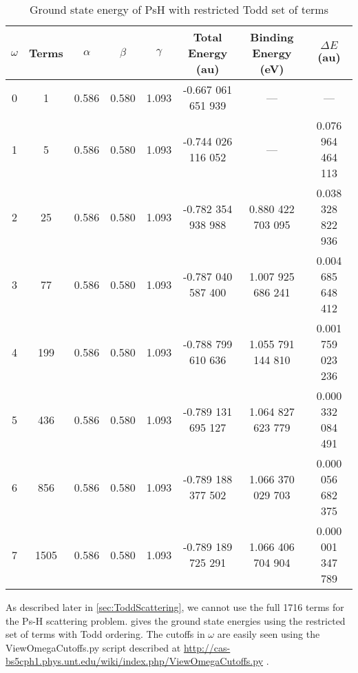 \documentclass[Dissertation.tex]{subfiles}
\begin{document}
\setlength{\abovecaptionskip}{6pt}   %
\setlength{\belowcaptionskip}{6pt}   %
\begin{table}[H]
\small
\centering
\begin{tabular}{c c c c c c c c}
\toprule
$\omega$ & Terms & $\alpha$ & $\beta$ & $\gamma$ & Total Energy (au) & Binding Energy (eV) & $\Delta E$ (au) \\ [0.5ex]
\midrule
0 & 1    & 0.586 & 0.580 & 1.093 & -0.667 061 651 939 & --- & --- \\
1 & 5    & 0.586 & 0.580 & 1.093 & -0.744 026 116 052 & ---               & 0.076 964 464 113 \\
2 & 25   & 0.586 & 0.580 & 1.093 & -0.782 354 938 988 & 0.880 422 703 095 & 0.038 328 822 936 \\
3 & 77   & 0.586 & 0.580 & 1.093 & -0.787 040 587 400 & 1.007 925 686 241 & 0.004 685 648 412 \\
4 & 199  & 0.586 & 0.580 & 1.093 & -0.788 799 610 636 & 1.055 791 144 810 & 0.001 759 023 236 \\
5 & 436  & 0.586 & 0.580 & 1.093 & -0.789 131 695 127 & 1.064 827 623 779 & 0.000 332 084 491 \\
6 & 856  & 0.586 & 0.580 & 1.093 & -0.789 188 377 502 & 1.066 370 029 703 & 0.000 056 682 375 \\
7 & 1505 & 0.586 & 0.580 & 1.093 & -0.789 189 725 291 & 1.066 406 704 904 & 0.000 001 347 789 \\
\bottomrule
\end{tabular}
\caption{Ground state energy of PsH with restricted Todd set of terms} %
\label{tab:BoundEnergyTodd1}
\end{table}

As described later in \cref{sec:ToddScattering}, we cannot use the full 1716 terms for the Ps-H scattering problem.  gives the ground state energies using the restricted set of terms with Todd ordering. The cutoffs in $\omega$ are easily seen using the ViewOmegaCutoffs.py script described at \url{http://cas-bs5cph1.phys.unt.edu/wiki/index.php/ViewOmegaCutoffs.py} \cite{Wiki}.
\end{document}

